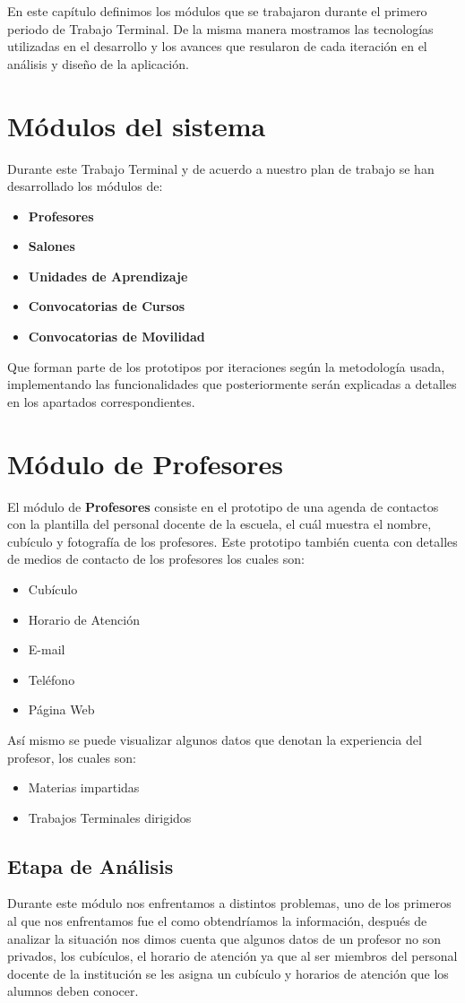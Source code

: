 En este capítulo definimos los módulos que se trabajaron durante el primero periodo de Trabajo Terminal. De la misma manera mostramos las tecnologías utilizadas en el desarrollo y los avances que resularon de cada iteración en el análisis y diseño de la aplicación.

\section{Módulos del sistema}
	Durante este Trabajo Terminal y de acuerdo a nuestro plan de trabajo se han desarrollado los módulos de:
	\begin{itemize}
		\item \textbf{Profesores}
		\item \textbf{Salones}
		\item \textbf{Unidades de Aprendizaje}
		\item \textbf{Convocatorias de Cursos}
		\item \textbf{Convocatorias de Movilidad}
	\end{itemize}
Que forman parte de los prototipos por iteraciones según la metodología usada, implementando las funcionalidades que posteriormente serán explicadas a detalles en los apartados correspondientes.
\section{Módulo de Profesores}	El módulo de \textbf{Profesores} consiste en el prototipo de una agenda de contactos con la plantilla del personal docente de la escuela, el cuál muestra el nombre, cubículo y fotografía de los profesores. Este prototipo también cuenta con detalles de medios de contacto de los profesores los cuales son:
	\begin{itemize}
		\item Cubículo
		\item Horario de Atención
		\item E-mail
		\item Teléfono
		\item Página Web
	\end{itemize}
	Así mismo se puede visualizar algunos datos que denotan la experiencia del profesor, los cuales son:
	\begin{itemize}
		\item Materias impartidas
		\item Trabajos Terminales dirigidos
	\end{itemize} 
	\subsection{Etapa de Análisis}
	Durante este módulo nos enfrentamos a distintos problemas, uno de los primeros al que nos enfrentamos fue el como obtendríamos la información, después de analizar la situación nos dimos cuenta que algunos datos de un profesor no son privados, los cubículos, el horario de atención ya que al ser miembros del personal docente de la institución se les asigna un cubículo y horarios de atención que los alumnos deben conocer. \\
	
